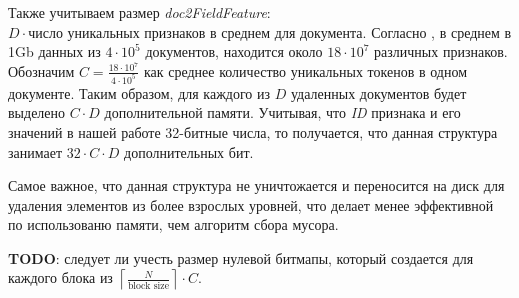 Также учитываем размер \textit{doc2FieldFeature}: $D \cdot \text{число уникальных
признаков в среднем для документа}$. Согласно \cite{Features:2020}, в среднем в
1Gb данных из $4\cdot 10^5$ документов, находится около $18 \cdot 10^7$ различных
признаков. Обозначим $C = \frac{18 \cdot 10^7}{4\cdot 10^5}$ как среднее количество
уникальных токенов в одном документе. Таким образом, для каждого из $D$ удаленных
документов будет выделено $C \cdot D$ дополнительной памяти. Учитывая, что
\textit{ID} признака и его значений в нашей работе 32-битные числа, то получается,
что данная структура занимает $32\cdot C\cdot D$ дополнительных бит.

Самое важное, что данная структура не уничтожается и переносится на диск для
удаления элементов из более взрослых уровней, что делает менее эффективной по
использованю памяти, чем алгоритм сбора мусора.

\textbf{TODO}: следует ли учесть размер нулевой битмапы, который создается для
каждого блока из $\left\lceil\frac{N}{\text{block size}}\right\rceil \cdot C$.